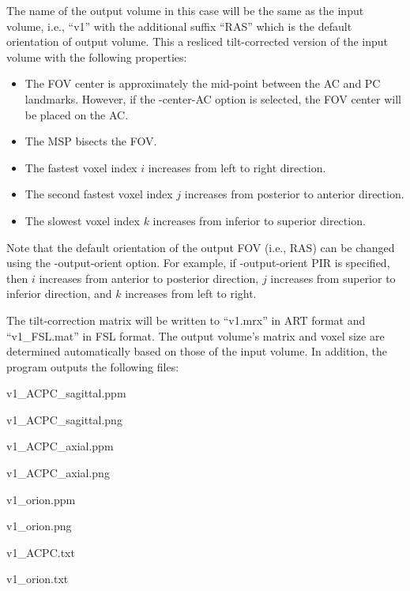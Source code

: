 \documentclass[11pt]{article}
\begin{document}
The name of the output volume in this case will be the same as the input volume, i.e., ``v1'' with the additional
suffix ``RAS'' which is the default orientation of output volume.  This a resliced tilt-corrected
version of the input volume with the following properties:
\begin{itemize}
\item The FOV center is approximately the mid-point between the AC and PC landmarks. However, if the -center-AC
option is selected, the FOV center will be placed on the AC.
\item The MSP bisects the FOV.
\item The fastest voxel index $i$ increases from left to right direction.
\item The second fastest voxel index $j$ increases from posterior to anterior direction.
\item The slowest voxel index $k$ increases from inferior to superior direction.
\end{itemize}
Note that the default orientation of the output FOV (i.e., RAS) can be changed using the -output-orient
option.  For example, if -output-orient PIR is specified, then 
$i$ increases from anterior to posterior direction,
$j$ increases from superior to inferior direction,
and $k$ increases from left to right. 

The tilt-correction matrix 
will be written to ``v1.mrx'' in ART format and ``v1\_FSL.mat'' in FSL format.  The output volume's
matrix and voxel size are determined automatically based on those of the input volume.
In addition, the program outputs the following files:

v1\_ACPC\_sagittal.ppm	

v1\_ACPC\_sagittal.png	

v1\_ACPC\_axial.ppm	

v1\_ACPC\_axial.png	

v1\_orion.ppm

v1\_orion.png		

v1\_ACPC.txt		

v1\_orion.txt
\end{document}
